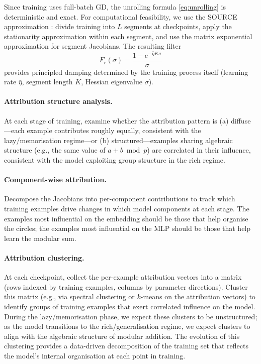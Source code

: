 \documentclass[11pt,a4paper]{article}
\begin{document}
Since training uses full-batch GD, the unrolling formula \eqref{eq:unrolling} is deterministic and exact. For computational feasibility, we use the SOURCE approximation \citep{bae2024source}: divide training into $L$ segments at checkpoints, apply the stationarity approximation within each segment, and use the matrix exponential approximation for segment Jacobians. The resulting filter
\begin{equation}
    F_r(\sigma) = \frac{1 - e^{-\bar{\eta} K \sigma}}{\sigma}
\end{equation}
provides principled damping determined by the training process itself (learning rate $\bar{\eta}$, segment length $K$, Hessian eigenvalue $\sigma$).

\paragraph{Attribution structure analysis.} At each stage of training, examine whether the attribution pattern is (a) diffuse---each example contributes roughly equally, consistent with the lazy/memorisation regime---or (b) structured---examples sharing algebraic structure (e.g., the same value of $a + b \bmod p$) are correlated in their influence, consistent with the model exploiting group structure in the rich regime.

\paragraph{Component-wise attribution.} Decompose the Jacobians into per-component contributions to track which training examples drive changes in which model components at each stage. The examples most influential on the embedding should be those that help organise the circles; the examples most influential on the MLP should be those that help learn the modular sum.

\paragraph{Attribution clustering.} At each checkpoint, collect the per-example attribution vectors into a matrix (rows indexed by training examples, columns by parameter directions). Cluster this matrix (e.g., via spectral clustering or $k$-means on the attribution vectors) to identify groups of training examples that exert correlated influence on the model. During the lazy/memorisation phase, we expect these clusters to be unstructured; as the model transitions to the rich/generalisation regime, we expect clusters to align with the algebraic structure of modular addition. The evolution of this clustering provides a data-driven decomposition of the training set that reflects the model's internal organisation at each point in training.
\end{document}
